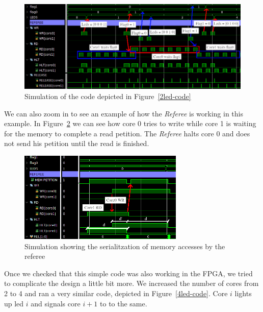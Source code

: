 \begin{figure}[h!]
    \centering
    \includegraphics[width=1.0\textwidth]{images/flag2_sim_crop_arrows.png}
    \caption{Simulation of the code depicted in Figure~\ref{2led-code}}
    \label{2led-sim}
\end{figure}


We can also zoom in to see an example of how the \textit{Referee} is working in this example. In Figure~\ref{2led-close} we can see how core 0 tries to write while core 1 is waiting for the memory to complete a read petition.
The \textit{Referee} halts core 0 and does not send his petition until the read is finished.

\begin{figure}[h!]
    \centering
    \includegraphics[width=0.7\textwidth]{images/flag2_sim_close_arrow.png}
    \caption{Simulation showing the serialitzation of memory accesses by the referee}
    \label{2led-close}
\end{figure}

Once we checked that this simple code was also working in the FPGA, we tried to complicate the design a little bit more.
We increased the number of cores from 2 to 4 and ran a very similar code, depicted in Figure~\ref{4led-code}. Core $i$ lights up led $i$ and signals core $i+1$ to to the same.


